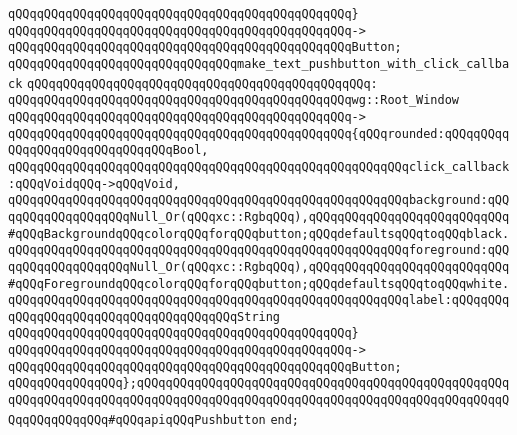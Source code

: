 \verb|qQQqqQQqqQQqqQQqqQQqqQQqqQQqqQQqqQQqqQQqqQQqqQQq}|\newline
\verb|qQQqqQQqqQQqqQQqqQQqqQQqqQQqqQQqqQQqqQQqqQQqqQQq->|\newline
\verb|qQQqqQQqqQQqqQQqqQQqqQQqqQQqqQQqqQQqqQQqqQQqqQQqButton;|\newline
\newline
\verb|qQQqqQQqqQQqqQQqqQQqqQQqqQQqqQQqmake_text_pushbutton_with_click_callback|\newline
\verb|qQQqqQQqqQQqqQQqqQQqqQQqqQQqqQQqqQQqqQQqqQQqqQQq:|\newline
\verb|qQQqqQQqqQQqqQQqqQQqqQQqqQQqqQQqqQQqqQQqqQQqqQQqwg::Root_Window|\newline
\verb|qQQqqQQqqQQqqQQqqQQqqQQqqQQqqQQqqQQqqQQqqQQqqQQq->|\newline
\verb|qQQqqQQqqQQqqQQqqQQqqQQqqQQqqQQqqQQqqQQqqQQqqQQq{qQQqrounded:qQQqqQQqqQQqqQQqqQQqqQQqqQQqqQQqBool,|\newline
\verb|qQQqqQQqqQQqqQQqqQQqqQQqqQQqqQQqqQQqqQQqqQQqqQQqqQQqqQQqclick_callback:qQQqVoidqQQq->qQQqVoid,|\newline
\verb|qQQqqQQqqQQqqQQqqQQqqQQqqQQqqQQqqQQqqQQqqQQqqQQqqQQqqQQqbackground:qQQqqQQqqQQqqQQqqQQqNull_Or(qQQqxc::RgbqQQq),qQQqqQQqqQQqqQQqqQQqqQQqqQQq#qQQqBackgroundqQQqcolorqQQqforqQQqbutton;qQQqdefaultsqQQqtoqQQqblack.|\newline
\verb|qQQqqQQqqQQqqQQqqQQqqQQqqQQqqQQqqQQqqQQqqQQqqQQqqQQqqQQqforeground:qQQqqQQqqQQqqQQqqQQqNull_Or(qQQqxc::RgbqQQq),qQQqqQQqqQQqqQQqqQQqqQQqqQQq#qQQqForegroundqQQqcolorqQQqforqQQqbutton;qQQqdefaultsqQQqtoqQQqwhite.|\newline
\verb|qQQqqQQqqQQqqQQqqQQqqQQqqQQqqQQqqQQqqQQqqQQqqQQqqQQqqQQqlabel:qQQqqQQqqQQqqQQqqQQqqQQqqQQqqQQqqQQqqQQqString|\newline
\verb|qQQqqQQqqQQqqQQqqQQqqQQqqQQqqQQqqQQqqQQqqQQqqQQq}|\newline
\verb|qQQqqQQqqQQqqQQqqQQqqQQqqQQqqQQqqQQqqQQqqQQqqQQq->|\newline
\verb|qQQqqQQqqQQqqQQqqQQqqQQqqQQqqQQqqQQqqQQqqQQqqQQqButton;|\newline
\newline
\verb|qQQqqQQqqQQqqQQq};qQQqqQQqqQQqqQQqqQQqqQQqqQQqqQQqqQQqqQQqqQQqqQQqqQQqqQQqqQQqqQQqqQQqqQQqqQQqqQQqqQQqqQQqqQQqqQQqqQQqqQQqqQQqqQQqqQQqqQQqqQQqqQQqqQQqqQQq#qQQqapiqQQqPushbutton|\newline
\verb|end;|\newline
\newline
\newline

